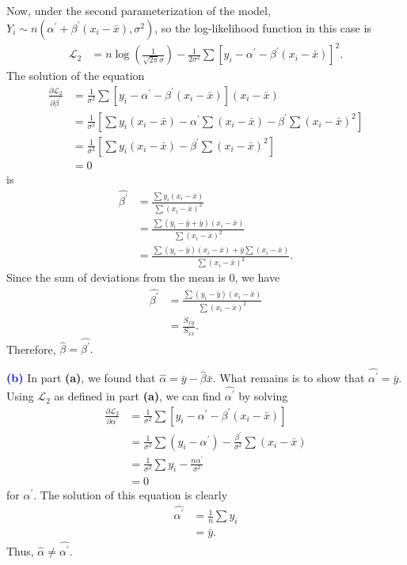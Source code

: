 \documentclass[12pt]{article}
\begin{document}
Now, under the second parameterization of the model, $Y_i \sim n(\alpha^{\prime} + \beta^{\prime}(x_i-\bar{x}), \sigma^2)$, so the log-likelihood function in this case is 
\begin{align}
\mathscr{L}_2 &= n\log\left(\frac{1}{\sqrt{2\pi}\sigma}\right) - \frac{1}{2\sigma^2}\sum[y_i - \alpha^{\prime} - \beta^{\prime} (x_i - \bar{x})]^2.
\end{align}
The solution of the equation 
\begin{align}
\frac{\partial \mathscr{L}_2}{\partial \beta^{\prime}} &= \frac{1}{\sigma^2}\sum [y_i - \alpha^{\prime} - \beta^{\prime} (x_i-\bar{x})](x_i-\bar{x}) \\
&= \frac{1}{\sigma^2}\left[\sum y_i(x_i - \bar{x}) - \alpha^{\prime}\sum(x_i - \bar{x}) - \beta^{\prime}\sum(x_i-\bar{x})^2\right] \\
&= \frac{1}{\sigma^2}\left[\sum y_i(x_i - \bar{x}) - \beta^{\prime}\sum(x_i-\bar{x})^2\right] \\
&= 0
\end{align}
is 
\begin{align}
\hat{\beta^{\prime}} &= \frac{\sum y_i(x_i - \bar{x})}{\sum (x_i-\bar{x})^2} \\
&= \frac{\sum (y_i - \bar{y} + \bar{y})(x_i - \bar{x})}{\sum (x_i-\bar{x})^2} \\
&= \frac{\sum (y_i-\bar{y})(x_i-\bar{x})+\bar{y}\sum(x_i-\bar{x})}{\sum (x_i-\bar{x})^2}.
\end{align}
Since the sum of deviations from the mean is $0$, we have 
\begin{align}
\hat{\beta^{\prime}} &= \frac{\sum (y_i-\bar{y})(x_i-\bar{x})}{\sum (x_i-\bar{x})^2} \\
&= \frac{S_{xy}}{S_{xx}}.
\end{align}
Therefore, $\hat{\beta} = \hat{\beta^{\prime}}.$ 

\vspace{3mm}

\noindent\textcolor{blue}{\textbf{(b)}} In part \textbf{(a)}, we found that $\hat{\alpha} = \bar{y} - \hat{\beta}\bar{x}.$ What remains is to show that $\hat{\alpha^{\prime}} = \bar{y}$.  Using $\mathscr{L}_2$ as defined in part \textbf{(a)}, we can find $\hat{\alpha^{\prime}}$ by solving 
\begin{align}
\frac{\partial \mathscr{L}_2}{\partial \alpha^{\prime}} &= \frac{1}{\sigma^2}\sum[y_i - \alpha^{\prime} - \beta^{\prime}(x_i - \bar{x})] \\
&= \frac{1}{\sigma^2}\sum(y_i - \alpha^{\prime}) - \frac{\beta^{\prime}}{\sigma^2} \sum (x_i - \bar{x}) \\
&= \frac{1}{\sigma^2}\sum y_i - \frac{n\alpha^{\prime}}{\sigma^2} \\
&= 0
\end{align}
for $\alpha^{\prime}$. The solution of this equation is clearly
\begin{align}
\hat{\alpha^{\prime}} &= \frac{1}{n}\sum y_i \\
&= \bar{y}.
\end{align}
Thus, $\hat{\alpha} \neq \hat{\alpha^{\prime}}$. 
\end{document}
